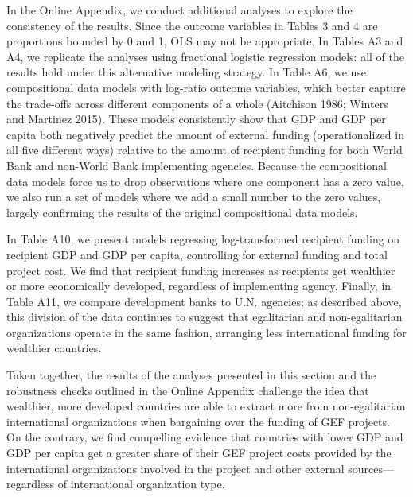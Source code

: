 \documentclass{article}
\begin{document}
In the Online Appendix, we conduct additional analyses to explore the consistency of the results.  Since the outcome variables in Tables 3 and 4 are proportions bounded by 0 and 1, OLS may not be appropriate.  In Tables A3 and A4, we replicate the analyses using fractional logistic regression models: all of the results hold under this alternative modeling strategy.  In Table A6, we use compositional data models with log-ratio outcome variables, which better capture the trade-offs across different components of a whole (Aitchison 1986; Winters and Martinez 2015).  These models consistently show that GDP and GDP per capita both negatively predict the amount of external funding (operationalized in all five different ways) relative to the amount of recipient funding for both World Bank and non-World Bank implementing agencies.  Because the compositional data models force us to drop observations where one component has a zero value, we also run a set of models where we add a small number to the zero values, largely confirming the results of the original compositional data models. 

In Table A10, we present models regressing log-transformed recipient funding on recipient GDP and GDP per capita, controlling for external funding and total project cost. We find that recipient funding increases as recipients get wealthier or more economically developed, regardless of implementing agency. Finally, in Table A11, we compare development banks to U.N. agencies; as described above, this division of the data continues to suggest that egalitarian and non-egalitarian organizations operate in the same fashion, arranging less international funding for wealthier countries. 

Taken together, the results of the analyses presented in this section and the robustness checks outlined in the Online Appendix challenge the idea that wealthier, more developed countries are able to extract more from non-egalitarian international organizations when bargaining over the funding of GEF projects. On the contrary, we find compelling evidence that countries with lower GDP and GDP per capita get a greater share of their GEF project costs provided by the international organizations involved in the project and other external sources––regardless of international organization type. 
\end{document}
